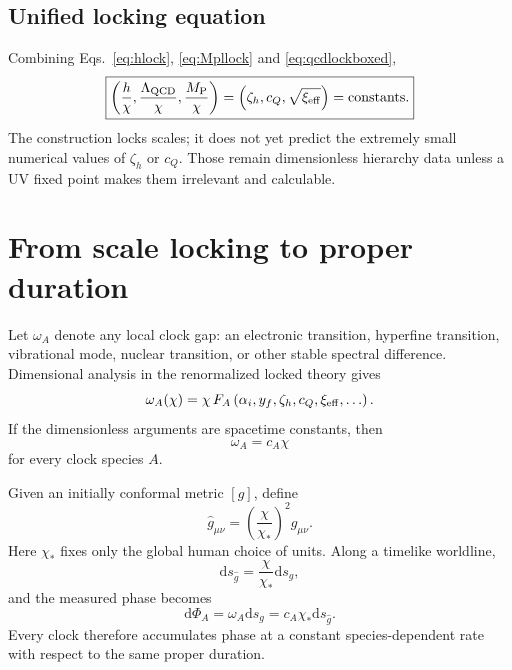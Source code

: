 \documentclass[11pt,a4paper]{article}
\newcommand{\dd}{\mathrm{d}}
\newcommand{\MP}{M_{\mathrm P}}
\newcommand{\QCD}{\mathrm{QCD}}
\begin{document}
\subsection{Unified locking equation}

Combining Eqs.~\eqref{eq:hlock}, \eqref{eq:Mpllock} and \eqref{eq:qcdlockboxed},
\begin{equation}
\boxed{
\left(
\frac{h}{\chi},
\frac{\Lambda_{\QCD}}{\chi},
\frac{\MP}{\chi}
\right)
=
\left(
\zeta_h,
c_Q,
\sqrt{\xi_{\rm eff}}
\right)
=\text{constants}.
}
\label{eq:triplelock}
\end{equation}
The construction locks scales; it does not yet predict the extremely small numerical values of $\zeta_h$ or $c_Q$. Those remain dimensionless hierarchy data unless a UV fixed point makes them irrelevant and calculable.

\section{From scale locking to proper duration}

Let $\omega_A$ denote any local clock gap: an electronic transition, hyperfine transition, vibrational mode, nuclear transition, or other stable spectral difference. Dimensional analysis in the renormalized locked theory gives
\begin{equation}
\omega_A(\chi)=
\chi\,
F_A\left(
\alpha_i,y_f,\zeta_h,c_Q,\xi_{\rm eff},\ldots
\right).
\label{eq:freqgeneral}
\end{equation}
If the dimensionless arguments are spacetime constants, then
\begin{equation}
\boxed{
\omega_A=c_A\chi
}
\label{eq:factorization}
\end{equation}
for every clock species $A$.

Given an initially conformal metric $[g]$, define
\begin{equation}
\boxed{
\widehat g_{\mu\nu}=\left(\frac{\chi}{\chi_*}\right)^2g_{\mu\nu}.
}
\label{eq:clockmetric}
\end{equation}
Here $\chi_*$ fixes only the global human choice of units. Along a timelike worldline,
\[
\dd s_{\widehat g}=\frac{\chi}{\chi_*}\dd s_g,
\]
and the measured phase becomes
\begin{equation}
\dd\Phi_A=\omega_A\dd s_g=c_A\chi_*\dd s_{\widehat g}.
\label{eq:phase}
\end{equation}
Every clock therefore accumulates phase at a constant species-dependent rate with respect to the same proper duration.
\end{document}

